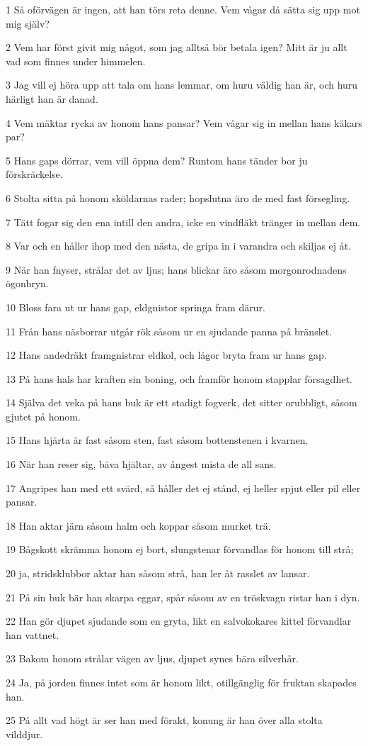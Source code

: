 \par 1 Så oförvägen är ingen, att han törs reta denne. Vem vågar då sätta sig upp mot mig själv?
\par 2 Vem har först givit mig något, som jag alltså bör betala igen? Mitt är ju allt vad som finnes under himmelen.
\par 3 Jag vill ej höra upp att tala om hans lemmar, om huru väldig han är, och huru härligt han är danad.
\par 4 Vem mäktar rycka av honom hans pansar? Vem vågar sig in mellan hans käkars par?
\par 5 Hans gaps dörrar, vem vill öppna dem? Runtom hans tänder bor ju förskräckelse.
\par 6 Stolta sitta på honom sköldarnas rader; hopslutna äro de med fast försegling.
\par 7 Tätt fogar sig den ena intill den andra, icke en vindfläkt tränger in mellan dem.
\par 8 Var och en håller ihop med den nästa, de gripa in i varandra och skiljas ej åt.
\par 9 När han fnyser, strålar det av ljus; hans blickar äro såsom morgonrodnadens ögonbryn.
\par 10 Bloss fara ut ur hans gap, eldgnistor springa fram därur.
\par 11 Från hans näsborrar utgår rök såsom ur en sjudande panna på bränslet.
\par 12 Hans andedräkt framgnistrar eldkol, och lågor bryta fram ur hans gap.
\par 13 På hans hals har kraften sin boning, och framför honom stapplar försagdhet.
\par 14 Själva det veka på hans buk är ett stadigt fogverk, det sitter orubbligt, såsom gjutet på honom.
\par 15 Hans hjärta är fast såsom sten, fast såsom bottenstenen i kvarnen.
\par 16 När han reser sig, bäva hjältar, av ångest mista de all sans.
\par 17 Angripes han med ett svärd, så håller det ej stånd, ej heller spjut eller pil eller pansar.
\par 18 Han aktar järn såsom halm och koppar såsom murket trä.
\par 19 Bågskott skrämma honom ej bort, slungstenar förvandlas för honom till strå;
\par 20 ja, stridsklubbor aktar han såsom strå, han ler åt rasslet av lansar.
\par 21 På sin buk bär han skarpa eggar, spår såsom av en tröskvagn ristar han i dyn.
\par 22 Han gör djupet sjudande som en gryta, likt en salvokokares kittel förvandlar han vattnet.
\par 23 Bakom honom strålar vägen av ljus, djupet synes bära silverhår.
\par 24 Ja, på jorden finnes intet som är honom likt, otillgänglig för fruktan skapades han.
\par 25 På allt vad högt är ser han med förakt, konung är han över alla stolta vilddjur.

